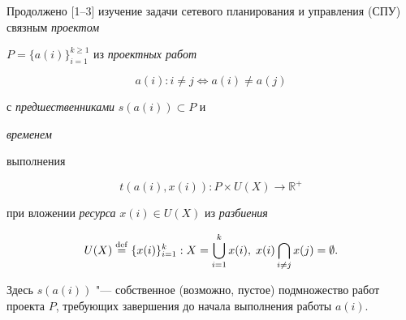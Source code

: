 


\date{02/VII/2010} %









\maketitle






 Продолжено [1--3] изучение  задачи сетевого планирования и управления (СПУ) связным {\em проектом }

$P=\{a(i)\}^{k\geq 1}_{i=1}$ из {\em проектных работ}

$$

a(i):i\neq j \Leftrightarrow a(i)\neq a(j)

$$

с {\em предшественниками} $s(a(i))\subset P$  и {\em временем

выполнения}

$$

t(a(i), x(i)): P{\times} U (X) \to \mathbb R^{+}

$$

при вложении {\em ресурса} $x(i)\in U(X)$ из {\em разбиения}

$$

U(X) \stackrel{\rm def}{=} \{x(i)\}^{k}_{i=1} : X =

\bigcup^{k}_{i=1} x(i), \; x(i)\bigcap_{i\neq j} x(j)=\emptyset.

$$

Здесь $s(a(i))$ "--- собственное (возможно, пустое) подмножество работ проекта $P$, требующих завершения до начала выполнения работы $a(i)$.



